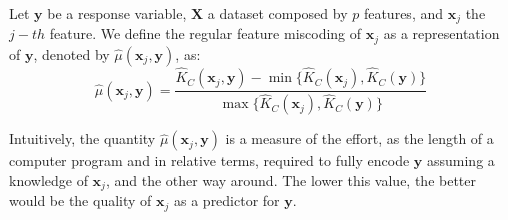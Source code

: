 \begin{definition}
Let $\mathbf{y}$ be a response variable, $\mathbf{X}$ a dataset composed by $p$ features, and $\mathbf{x}_j$ the $j-th$ feature. We define the regular feature miscoding of $\mathbf{x}_j$ as a representation of $\mathbf{y}$, denoted by $\hat\mu(\mathbf{x}_j, \mathbf{y})$, as:
\[
\hat\mu(\mathbf{x}_j, \mathbf{y}) = \frac{ \hat{K}_C(\mathbf{x}_j, \mathbf{y}) - \min\{ \hat{K}_C(\mathbf{x}_j), \hat{K}_C(\mathbf{y}) \} } { \max\{ \hat{K}_C(\mathbf{x}_j), \hat{K}_C(\mathbf{y}) \} }
\]\end{definition}

Intuitively, the quantity $\hat\mu(\mathbf{x}_j, \mathbf{y})$ is a measure of the effort, as the length of a computer program and in relative terms, required to fully encode $\mathbf{y}$ assuming a knowledge of $\mathbf{x}_j$, and the other way around. The lower this value, the better would be the quality of $\mathbf{x}_j$ as a predictor for $\mathbf{y}$.

